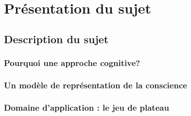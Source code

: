 \part{Présentation du sujet}

\clearemptydoublepage
\chapter{Description du sujet} 


\section{Pourquoi une approche cognitive?} 


\section{Un modèle de représentation de la conscience}
\label{un_modele_de_representation_de_la_conscience}


\section{Domaine d'application : le jeu de plateau}
